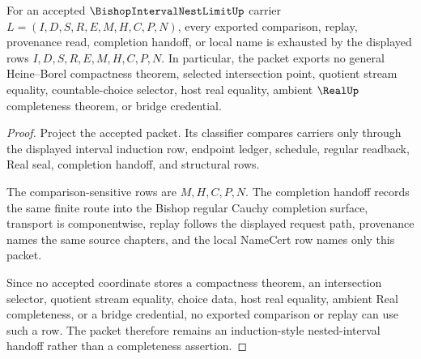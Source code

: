\begin{theorem}
\label{thm:bishop-interval-nest-limit-nonescape}
For an accepted $\BishopIntervalNestLimitUp$ carrier $L=(I,D,S,R,E,M,H,C,P,N)$, every exported comparison, replay, provenance read, completion handoff, or local name is exhausted by the displayed rows $I,D,S,R,E,M,H,C,P,N$. In particular, the packet exports no general Heine--Borel compactness theorem, selected intersection point, quotient stream equality, countable-choice selector, host real equality, ambient $\RealUp$ completeness theorem, or bridge credential.
\end{theorem}
\begin{proof}
Project the accepted packet. Its classifier compares carriers only through the displayed interval induction row, endpoint ledger, schedule, regular readback, Real seal, completion handoff, and structural rows.

The comparison-sensitive rows are $M,H,C,P,N$. The completion handoff records the same finite route into the Bishop regular Cauchy completion surface, transport is componentwise, replay follows the displayed request path, provenance names the same source chapters, and the local NameCert row names only this packet.

Since no accepted coordinate stores a compactness theorem, an intersection selector, quotient stream equality, choice data, host real equality, ambient Real completeness, or a bridge credential, no exported comparison or replay can use such a row. The packet therefore remains an induction-style nested-interval handoff rather than a completeness assertion.
\end{proof}


